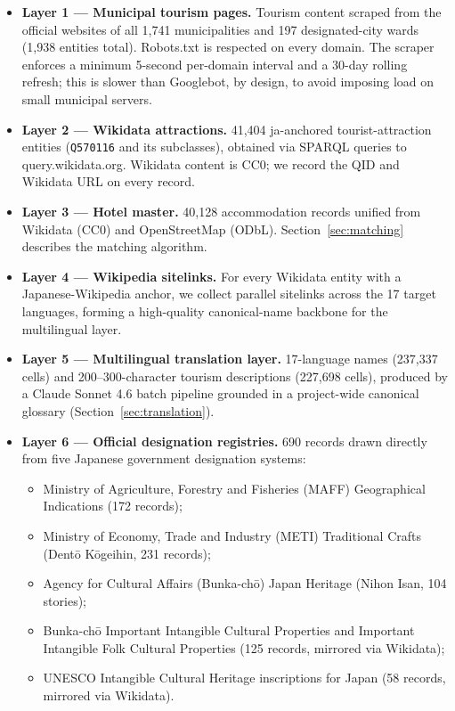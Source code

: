 \documentclass[11pt,a4paper]{article}
\begin{document}
\begin{itemize}
  \item \textbf{Layer 1 — Municipal tourism pages.} Tourism content scraped
  from the official websites of all 1{,}741 municipalities and 197
  designated-city wards (1{,}938 entities total). Robots.txt is respected
  on every domain. The scraper enforces a minimum 5-second per-domain
  interval and a 30-day rolling refresh; this is slower than Googlebot,
  by design, to avoid imposing load on small municipal servers.

  \item \textbf{Layer 2 — Wikidata attractions.} 41{,}404 ja-anchored
  tourist-attraction entities (\texttt{Q570116} and its subclasses),
  obtained via SPARQL queries to query.wikidata.org. Wikidata content is
  CC0; we record the QID and Wikidata URL on every record.

  \item \textbf{Layer 3 — Hotel master.} 40{,}128 accommodation records
  unified from Wikidata (CC0) and OpenStreetMap (ODbL). Section~\ref{sec:matching}
  describes the matching algorithm.

  \item \textbf{Layer 4 — Wikipedia sitelinks.} For every Wikidata entity
  with a Japanese-Wikipedia anchor, we collect parallel sitelinks across
  the 17 target languages, forming a high-quality canonical-name backbone
  for the multilingual layer.

  \item \textbf{Layer 5 — Multilingual translation layer.} 17-language
  names (237{,}337 cells) and 200--300-character tourism descriptions
  (227{,}698 cells), produced by a Claude Sonnet 4.6 batch pipeline
  grounded in a project-wide canonical glossary
  (Section~\ref{sec:translation}).

  \item \textbf{Layer 6 — Official designation registries.} 690 records
  drawn directly from five Japanese government designation systems:

  \begin{itemize}
    \item Ministry of Agriculture, Forestry and Fisheries (MAFF)
    Geographical Indications (172 records);
    \item Ministry of Economy, Trade and Industry (METI) Traditional
    Crafts (Dent\=o K\=ogeihin, 231 records);
    \item Agency for Cultural Affairs (Bunka-ch\=o) Japan Heritage
    (Nihon Isan, 104 stories);
    \item Bunka-ch\=o Important Intangible Cultural Properties and
    Important Intangible Folk Cultural Properties (125 records, mirrored
    via Wikidata);
    \item UNESCO Intangible Cultural Heritage inscriptions for Japan
    (58 records, mirrored via Wikidata).
  \end{itemize}


\end{itemize}
\end{document}
